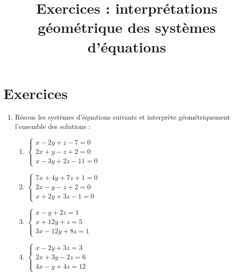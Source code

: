 

\title{Exercices : interprétations géométrique des systèmes d'équations}
\date{}



	\maketitle

	\section{Exercices}
		\begin{enumerate}
			\item Résous les systèmes d'équations suivants et interprète géométriquement l'ensemble des solutions :
				\begin{enumerate}
					\item $\left\{
					\begin{array}{l}
						x - 2y + z -7 = 0 \\
						2x + y - z + 2 = 0 \\
						x - 3y + 2z - 11 = 0
					\end{array}
					\right.$
					
					\item $\left\{
					\begin{array}{l}
						7x + 4y + 7z + 1 = 0 \\
						2x - y - z + 2 = 0 \\
						x + 2y + 3z - 1 = 0
					\end{array}
					\right.$
					
					\item $\left\{
					\begin{array}{l}
						x - y + 2z = 1 \\
						x + 12y + z = 5 \\
						3x - 12y + 8z = 1
					\end{array}
					\right.$
					
					\item $\left\{
					\begin{array}{l}
						x - 2y + 3z = 3 \\
						2x + 3y - 2z = 6 \\
						4x - y + 4z = 12
					\end{array}
					\right.$
				\end{enumerate}
		\end{enumerate}
	
